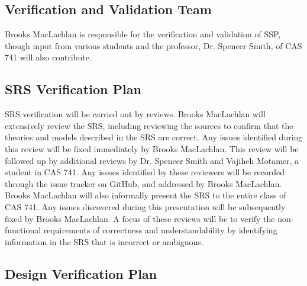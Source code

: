 \documentclass[12pt, titlepage]{article}
\newcommand{\progname}{SSP}
\begin{document}
\subsection{Verification and Validation Team}

\noindent Brooks MacLachlan is responsible for the verification and validation 
of \progname{}, though input from various students and the professor, Dr. 
Spencer 
Smith, of CAS 741 will also contribute.

\subsection{SRS Verification Plan}

\noindent SRS verification will be carried out by reviews. Brooks MacLachlan 
will extensively review the SRS, including reviewing the sources to confirm 
that the theories and models described in the SRS are correct. Any issues 
identified during this review will be fixed immediately by Brooks MacLachlan. 
This review will be followed up by additional reviews by Dr. Spencer Smith and 
Vajiheh Motamer, a student in CAS 741. Any issues identified by these reviewers 
will be recorded through the issue tracker on GitHub, and addressed by Brooks 
MacLachlan. Brooks MacLachlan will also informally present the SRS to the 
entire class of CAS 741. Any issues discovered during this presentation will be 
subsequently fixed by Brooks MacLachlan. A focus of these reviews will be to 
verify the non-functional requirements of correctness and understandability by 
identifying information in the SRS that is incorrect or ambiguous.

\subsection{Design Verification Plan}
\end{document}
